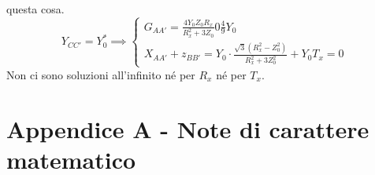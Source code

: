\documentclass{book}
\begin{document}
        questa cosa. \\
        \begin{equation}
            Y_{CC'} = Y_{0} ^{*} \implies 
            \begin{cases}
                G_{AA'} = \displaystyle \frac{4Y_{0}Z_{0}R_{x}}{R_{x} ^{2}+3Z_{0}} 0 \frac{4}{9}Y_{0} \\
                X_{AA'}+z_{BB'} = Y_{0} \cdot \displaystyle \frac{\sqrt{3}(R_{x} ^{2}-Z_{0} ^{2})}{R_{x} ^{2}+3Z_{0} ^{2}} +Y_{0}T_{x} = 0
            \end{cases}
        \end{equation}
        Non ci sono soluzioni all'infinito né per $R_{x}$ né per $T_{x}$.




\chapter*{Appendice A - Note di carattere matematico}
\end{document}
